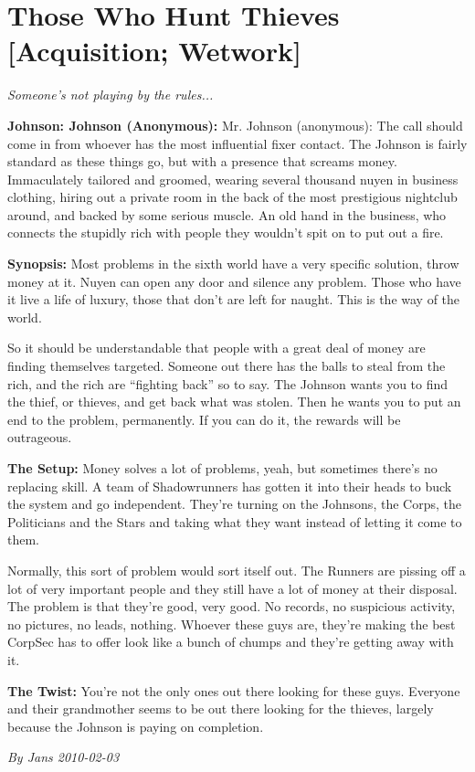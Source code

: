 \documentclass[letterpaper,twocolumn,10.5pt]{article}
\newenvironment{scenario}[6]
	{
		\section{#1 {\small[#2]}}
		\textit{#3}
		\def\TMPSCENARIO{#4 #5}
	}
	{\small\textit{By \TMPSCENARIO}}
\newcommand{\johnson}[2]{\textbf{Johnson: #1 (#2):}}
\newcommand{\synopsis}{\textbf{Synopsis: }}
\newcommand{\twist}{\textbf{The Twist: }}
\begin{document}
\begin{scenario}{Those Who Hunt Thieves}
	{Acquisition; Wetwork}
	{ Someone's not playing by the rules...}
	{Jans}
	{2010-02-03}
	{https://forum.rpg.net/showthread.php?321504-Shadowrun-4th-101-Instant-Scenarios\&p=11636919#post11636919}

\johnson{Johnson}{Anonymous}
Mr. Johnson (anonymous): The call should come in from whoever has the most influential fixer contact. The Johnson is fairly standard as these things go, but with a presence that screams money. Immaculately tailored and groomed, wearing several thousand nuyen in business clothing, hiring out a private room in the back of the most prestigious nightclub around, and backed by some serious muscle. An old hand in the business, who connects the stupidly rich with people they wouldn't spit on to put out a fire.

\synopsis 
Most problems in the sixth world have a very specific solution, throw money at it. Nuyen can open any door and silence any problem. Those who have it live a life of luxury, those that don't are left for naught. This is the way of the world.

So it should be understandable that people with a great deal of money are finding themselves targeted. Someone out there has the balls to steal from the rich, and the rich are ``fighting back'' so to say. The Johnson wants you to find the thief, or thieves, and get back what was stolen. Then he wants you to put an end to the problem, permanently. If you can do it, the rewards will be outrageous.

\textbf{The Setup:} Money solves a lot of problems, yeah, but sometimes there's no replacing skill. A team of Shadowrunners has gotten it into their heads to buck the system and go independent. They're turning on the Johnsons, the Corps, the Politicians and the Stars and taking what they want instead of letting it come to them.

Normally, this sort of problem would sort itself out. The Runners are pissing off a lot of very important people and they still have a lot of money at their disposal. The problem is that they're good, very good. No records, no suspicious activity, no pictures, no leads, nothing. Whoever these guys are, they're making the best CorpSec has to offer look like a bunch of chumps and they're getting away with it.

\twist You're not the only ones out there looking for these guys. Everyone and their grandmother seems to be out there looking for the thieves, largely because the Johnson is paying on completion.


\end{scenario}
\end{document}
